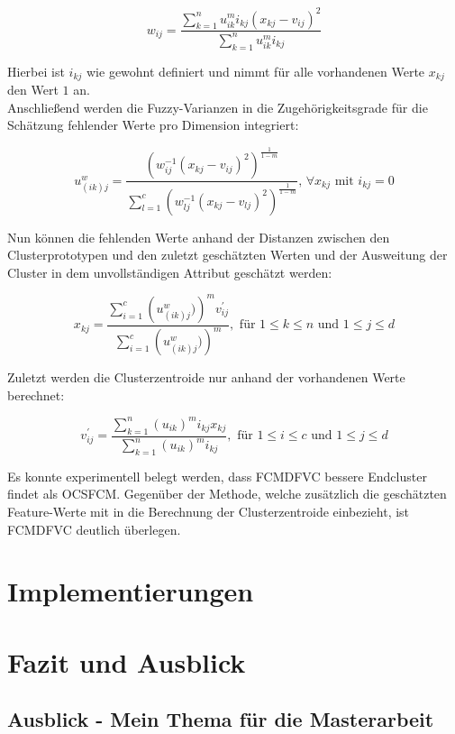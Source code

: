 \documentclass[11pt,ceqn]{book}
\begin{document}
$$w_{ij} = \frac{\sum\limits_{k=1}^n u_{ik}^m i_{kj} (x_{kj}-v_{ij})^2}{\sum\limits_{k=1}^n u_{ik}^m i_{kj}}$$

Hierbei ist $i_{kj}$ wie gewohnt definiert und nimmt für alle vorhandenen Werte $x_{kj}$ den Wert $1$ an.\\

Anschließend werden die Fuzzy-Varianzen in die Zugehörigkeitsgrade für die Schätzung fehlender Werte pro Dimension integriert:

$$u_{(ik)j}^w = \frac{\left(w_{ij}^{-1}(x_{kj}-v_{ij})^2 \right)^{\frac{1}{1-m}}}{\sum\limits_{l=1}^c \left(w_{lj}^{-1}(x_{kj}-v_{lj})^2\right)^{\frac{1}{1-m}}}, \, \forall x_{kj} \text{ mit } i_{kj}=0$$

Nun können die fehlenden Werte anhand der Distanzen zwischen den Clusterprototypen und den zuletzt geschätzten Werten und der Ausweitung der Cluster in dem unvollständigen Attribut geschätzt werden:

$$x_{kj} = \frac{\sum\limits_{i=1}^c \left(u_{(ik)j}^w) \right)^m v_{ij}^{\prime}}{\sum\limits_{i=1}^c \left(u_{(ik)j}^w) \right)^m}, \text{ für } 1\leqslant k \leqslant n \text{ und } 1\leqslant j\leqslant d$$

Zuletzt werden die Clusterzentroide nur anhand der vorhandenen Werte berechnet:

$$v_{ij}^{\prime} = \frac{\sum\limits_{k=1}^n (u_{ik})^m i_{kj} x_{kj}}{\sum\limits_{k=1}^n (u_{ik})^m i_{kj}},\text{ für }  1\leqslant i \leqslant c \text{ und } 1\leqslant j \leqslant d$$

Es konnte experimentell belegt werden, dass FCMDFVC bessere Endcluster findet als OCSFCM. Gegenüber der Methode, welche zusätzlich die geschätzten Feature-Werte mit in die Berechnung der Clusterzentroide einbezieht, ist FCMDFVC deutlich überlegen.

\chapter{Implementierungen}


\chapter{Fazit und Ausblick}
\section{Ausblick - Mein Thema für die Masterarbeit}


\printbibliography
\end{document}
